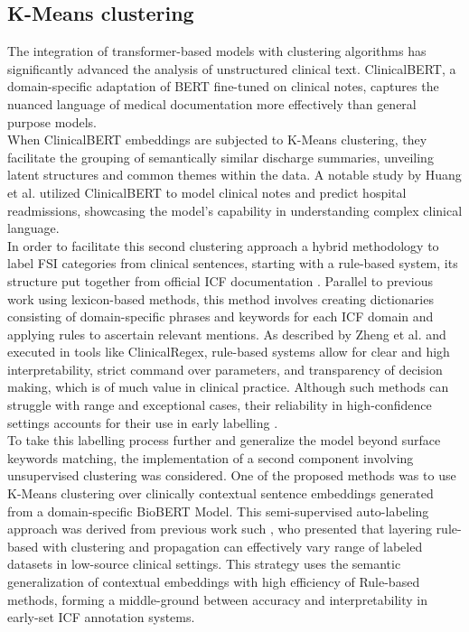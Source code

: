 \subsection{K-Means clustering}
The integration of transformer-based models with clustering algorithms has significantly advanced the analysis of unstructured clinical text. ClinicalBERT, a domain-specific adaptation of BERT fine-tuned on clinical notes, captures the nuanced language of medical documentation more effectively than general purpose models. \\

When ClinicalBERT embeddings are subjected to K-Means clustering, they facilitate the grouping of semantically similar discharge summaries, unveiling latent structures and common themes within the data. A notable study by Huang et al. \cite{huang2019} utilized ClinicalBERT to model clinical notes and predict hospital readmissions, showcasing the model's capability in understanding complex clinical language. \\

In order to facilitate this second clustering approach a hybrid methodology to label FSI categories from clinical sentences, starting with a rule-based system, its structure put together from official ICF documentation \cite{CommCognitionGuideline2023, InterpersonalGuideline2023, MobilityGuideline2023, SelfCareGuideline2023}. Parallel to previous work using lexicon-based methods, this method involves creating dictionaries consisting of domain-specific phrases and keywords for each ICF domain and applying rules to ascertain relevant mentions. As described by Zheng et al. \cite{zheng2010} and executed in tools like ClinicalRegex, rule-based systems allow for clear and high interpretability, strict command over parameters, and transparency of decision making, which is of much value in clinical practice. Although such methods can struggle with range and exceptional cases, their reliability in high-confidence settings accounts for their use in early labelling \cite{hong2020}. \\

To take this labelling process further and generalize the model beyond surface keywords matching, the implementation of a second component involving unsupervised clustering was considered. One of the proposed methods was to use K-Means clustering over clinically contextual sentence embeddings generated from a domain-specific BioBERT Model. This semi-supervised auto-labeling approach was derived from previous work such \cite{eisman2021, greenes2018}, who presented that layering rule-based with clustering and propagation can effectively vary range of labeled datasets in low-source clinical settings.  This strategy uses the semantic generalization of contextual embeddings with high efficiency of Rule-based methods, forming a middle-ground between accuracy and interpretability in early-set ICF annotation systems.

